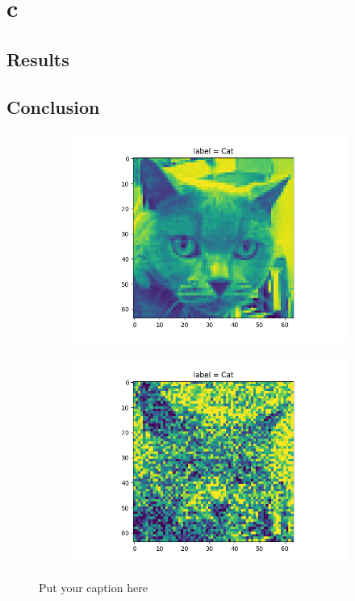 \documentclass{article}
\begin{document}
\newpage
\section{c}
\subsection{Results}
\subsection{Conclusion}
\begin{figure}[H]
\begin{subfigure}{.5\textwidth}
  \centering
  \includegraphics[width=1\linewidth]{2a/pic.png}  
  
  \label{fig:sub-first}
\end{subfigure}
\begin{subfigure}{.5\textwidth}
  \centering
  \includegraphics[width=1\linewidth]{2a/Noisy pic.png}  
  
  \label{fig:sub-second}
\end{subfigure}
\caption{Put your caption here}
\label{noise pics}
\end{figure}
\end{document}
